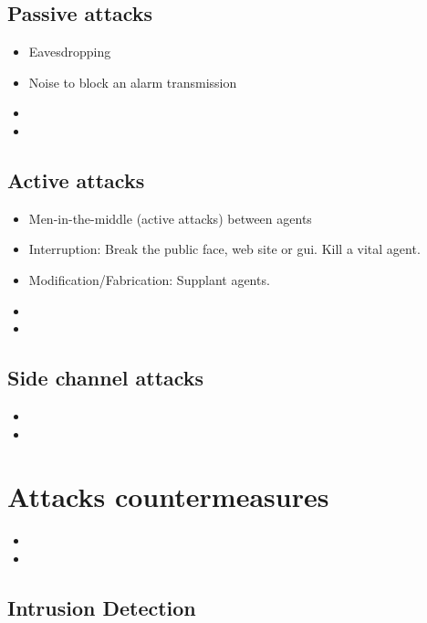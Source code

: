 \documentclass[10pt,a4paper,twoside]{llncs}
\begin{document}
%
\subsection{Passive attacks \label{sec:passiveAttacks}}

\begin{itemize}
    \item Eavesdropping
    \item Noise to block an alarm transmission
    \item 
    \item 
\end{itemize}

%
\subsection{Active attacks \label{sec:activeAttacks}}

\begin{itemize}
    \item Men-in-the-middle (active attacks) between agents
    \item Interruption: Break the public face, web site or gui. Kill a vital agent.
    \item Modification/Fabrication: Supplant agents.
    \item 
    \item 
\end{itemize}

%
\subsection{Side channel attacks \label{sec:sideChannelAttacks}}

\begin{itemize}
    \item
    \item 
\end{itemize}

%
\section{Attacks countermeasures \label{sec:countermeasures}}

\begin{itemize}
    \item
    \item 
\end{itemize}

%
\subsection{Intrusion Detection \label{sec:intrusionDetection}}
\end{document}
